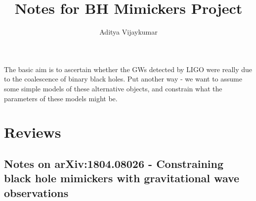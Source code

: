 \documentclass[a4paper,11pt]{article}
\title{\textbf{Notes for BH Mimickers Project}}
\author{Aditya Vijaykumar}
\affiliation{International Centre for Theoretical Sciences, Bengaluru, India.}
\begin{document}
\maketitle

The basic aim is to ascertain whether the GWs detected by LIGO were really due to the coalescence of binary black holes. Put another way - we want to assume some simple models of these alternative objects, and constrain what the parameters of these models might be.

\section{Reviews}

\subsection{Notes on arXiv:1804.08026 - Constraining black hole mimickers with gravitational wave observations}
\end{document}

